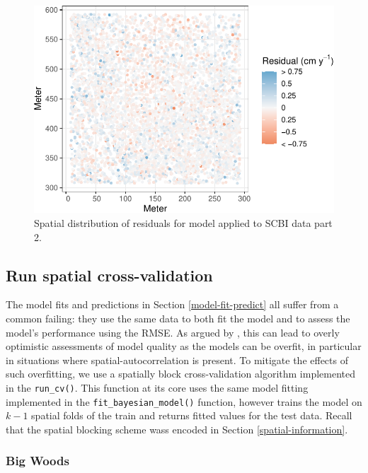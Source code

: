 \documentclass[12pt]{article}
\begin{document}
\begin{figure}

{\centering \includegraphics[width=1\linewidth]{Figures/scbi-model-residuals-2-1} 

}

\caption{Spatial distribution of residuals for model applied to SCBI data part 2.}\label{fig:scbi-model-residuals-2}
\end{figure}

\hypertarget{run-spatial-cross-validation}{%
\subsection{Run spatial
cross-validation}\label{run-spatial-cross-validation}}

The model fits and predictions in Section \ref{model-fit-predict} all
suffer from a common failing: they use the same data to both fit the
model and to assess the model's performance using the RMSE. As argued by
\citet{roberts_cross-validation_2017}, this can lead to overly
optimistic assessments of model quality as the models can be overfit, in
particular in situations where spatial-autocorrelation is present. To
mitigate the effects of such overfitting, we use a spatially block
cross-validation algorithm implemented in the \texttt{run\_cv()}. This
function at its core uses the same model fitting implemented in the
\texttt{fit\_bayesian\_model()} function, however trains the model on
\(k-1\) spatial folds of the train and returns fitted values for the
test data. Recall that the spatial blocking scheme wass encoded in
Section \ref{spatial-information}.

\hypertarget{big-woods-5}{%
\subsubsection{Big Woods}\label{big-woods-5}}
\end{document}
